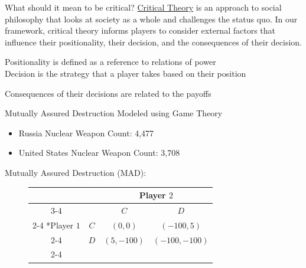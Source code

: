 \documentclass[10pt]{beamer} %
\theoremstyle{plain} %
\theoremstyle{definition} %
\begin{document}
\begin{frame}{\color{Maroon} What should it mean to be critical?}
\noindent \underline{Critical Theory} is an approach to social philosophy that looks at society as a whole and challenges the status quo. In our framework, critical theory informs players to consider external factors that influence their positionality, their decision, and the consequences of their decision. \\ 
\vfill

Positionality is defined as a  reference to relations of power \\

\vfill
Decision is the strategy that a player takes based on their position \\

\vfill

Consequences of their decisions are related to the payoffs


\end{frame}

\begin{frame}{\color{Maroon} Mutually Assured Destruction Modeled using Game Theory}
\vfill

\begin{itemize}
    \item Russia Nuclear Weapon Count: 4,477
    \item United States Nuclear Weapon Count: 3,708
\end{itemize}
\vfill
\noindent Mutually Assured Destruction (MAD):
\begin{figure}[h]
\centering
\caption{MAD Payoff Matrix Between the United States and Russia}
\label{Collective action problem in the Prisoners' Dilemma}
\begin{table}
    \setlength{\extrarowheight}{2pt}
    \begin{tabular}{*{4}{c|}}
      \multicolumn{2}{c}{} & \multicolumn{2}{c}{Player $2$}\\\cline{3-4}
      \multicolumn{1}{c}{} &  & $C$  & $D$ \\\cline{2-4}
      \multirow{2}*{Player $1$}  & $C$ & $(0,0)$ & $(-100, 5)$ \\\cline{2-4}
      & $D$ & $(5,-100)$ & $(-100,-100)$ \\\cline{2-4}
    \end{tabular}
  \end{table}
\end{figure}
\end{frame}
\end{document}
